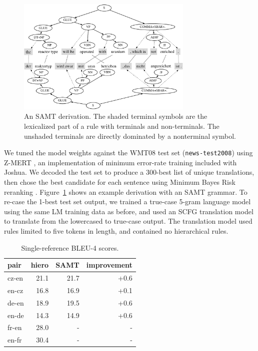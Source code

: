 \documentclass[11pt]{article}
\begin{document}
\begin{figure}[t]
  \centering
  \includegraphics[width=0.75\textwidth]{figures/derivation}
  \caption{An SAMT derivation. The shaded terminal symbols are the lexicalized part of a rule with terminals and non-terminals. The unshaded terminals are directly dominated by a nonterminal symbol.}
  \label{figure:derivation}
\end{figure}

We tuned the model weights against the WMT08 test set ({\tt news-test2008}) using Z-MERT \cite{zaidan2009z}, an
implementation of minimum error-rate training included with Joshua.  We decoded the test set to produce a 300-best list of unique
translations, then chose the best candidate for each sentence using
Minimum Bayes Risk reranking \cite{kumar2004minimum}.
Figure~\ref{figure:derivation} shows an example derivation with an
SAMT grammar.  To re-case the 1-best test set output, we trained a
true-case 5-gram language
model using the same LM training data as before, and used an SCFG
translation model to translate from the lowercased to true-case
output.  The translation model used rules limited to five tokens in length, and contained no hierarchical rules. 

\begin{table}[t]
  \centering
  \begin{tabular}{l|rrr}
    pair   & hiero & SAMT & improvement \\
    \hline\hline
    cz-en  & 21.1  & 21.7 & +0.6 \\
    en-cz  & 16.8  & 16.9 & +0.1 \\
    de-en  & 18.9  & 19.5 & +0.6 \\
    en-de  & 14.3  & 14.9 & +0.6 \\
    fr-en  & 28.0  & - & - \\
    en-fr  & 30.4  & - & - \\
  \end{tabular}
  \caption{Single-reference BLEU-4 scores.}
  \label{table:results}
\end{table}
\end{document}
